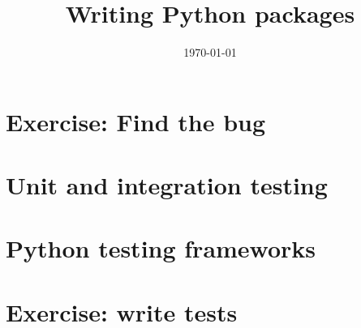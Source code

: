 \documentclass[10pt]{beamer}
\title{Writing Python packages}
\date[]{\today}
\begin{document}
\begin{frame}
  \titlepage
\end{frame}


\section{Exercise: Find the bug}


\section{Unit and integration testing}


\section{Python testing frameworks}


\section{Exercise: write tests}
\end{document}
